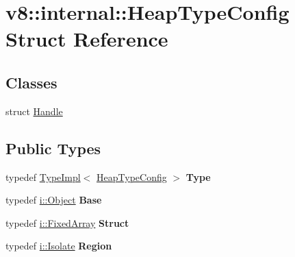 \hypertarget{structv8_1_1internal_1_1_heap_type_config}{}\section{v8\+:\+:internal\+:\+:Heap\+Type\+Config Struct Reference}
\label{structv8_1_1internal_1_1_heap_type_config}
\subsection*{Classes}
\begin{DoxyCompactItemize}
\item 
struct \hyperlink{structv8_1_1internal_1_1_heap_type_config_1_1_handle}{Handle}
\end{DoxyCompactItemize}
\subsection*{Public Types}
\begin{DoxyCompactItemize}
\item 
\hypertarget{structv8_1_1internal_1_1_heap_type_config_a9da4c0cf84fdb26c97cb22e6a8f5b87d}{}typedef \hyperlink{classv8_1_1internal_1_1_type_impl}{Type\+Impl}$<$ \hyperlink{structv8_1_1internal_1_1_heap_type_config}{Heap\+Type\+Config} $>$ {\bfseries Type}\label{structv8_1_1internal_1_1_heap_type_config_a9da4c0cf84fdb26c97cb22e6a8f5b87d}

\item 
\hypertarget{structv8_1_1internal_1_1_heap_type_config_a16f81427d6e6fa7a2f0120daddb6e641}{}typedef \hyperlink{classv8_1_1internal_1_1_object}{i\+::\+Object} {\bfseries Base}\label{structv8_1_1internal_1_1_heap_type_config_a16f81427d6e6fa7a2f0120daddb6e641}

\item 
\hypertarget{structv8_1_1internal_1_1_heap_type_config_ae5a51afa3b055a9e8373d79151003080}{}typedef \hyperlink{classv8_1_1internal_1_1_fixed_array}{i\+::\+Fixed\+Array} {\bfseries Struct}\label{structv8_1_1internal_1_1_heap_type_config_ae5a51afa3b055a9e8373d79151003080}

\item 
\hypertarget{structv8_1_1internal_1_1_heap_type_config_ab0edd3383649e221702c340b5a4ead84}{}typedef \hyperlink{classv8_1_1internal_1_1_isolate}{i\+::\+Isolate} {\bfseries Region}\label{structv8_1_1internal_1_1_heap_type_config_ab0edd3383649e221702c340b5a4ead84}

\end{DoxyCompactItemize}
